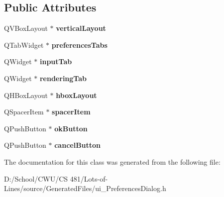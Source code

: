 \subsection*{Public Attributes}
\begin{DoxyCompactItemize}
\item 
Q\+V\+Box\+Layout $\ast$ {\bfseries vertical\+Layout}\hypertarget{class_ui___preferences_dialog_ade30da332012acc7e9342c469ea9ced9}{}\label{class_ui___preferences_dialog_ade30da332012acc7e9342c469ea9ced9}

\item 
Q\+Tab\+Widget $\ast$ {\bfseries preferences\+Tabs}\hypertarget{class_ui___preferences_dialog_a17f3d8be9847cae3c0a5026be2cda41f}{}\label{class_ui___preferences_dialog_a17f3d8be9847cae3c0a5026be2cda41f}

\item 
Q\+Widget $\ast$ {\bfseries input\+Tab}\hypertarget{class_ui___preferences_dialog_a59a7e50717c7178825b430269b5c4657}{}\label{class_ui___preferences_dialog_a59a7e50717c7178825b430269b5c4657}

\item 
Q\+Widget $\ast$ {\bfseries rendering\+Tab}\hypertarget{class_ui___preferences_dialog_a103adee0971c954677c4d8dfb1652345}{}\label{class_ui___preferences_dialog_a103adee0971c954677c4d8dfb1652345}

\item 
Q\+H\+Box\+Layout $\ast$ {\bfseries hbox\+Layout}\hypertarget{class_ui___preferences_dialog_a593e29b0541f5b22ea623a82d47eae52}{}\label{class_ui___preferences_dialog_a593e29b0541f5b22ea623a82d47eae52}

\item 
Q\+Spacer\+Item $\ast$ {\bfseries spacer\+Item}\hypertarget{class_ui___preferences_dialog_a04494ffb0efea38588c361090e354c00}{}\label{class_ui___preferences_dialog_a04494ffb0efea38588c361090e354c00}

\item 
Q\+Push\+Button $\ast$ {\bfseries ok\+Button}\hypertarget{class_ui___preferences_dialog_a4cb797d31b7647bbe35eae1b5b9a4f1d}{}\label{class_ui___preferences_dialog_a4cb797d31b7647bbe35eae1b5b9a4f1d}

\item 
Q\+Push\+Button $\ast$ {\bfseries cancel\+Button}\hypertarget{class_ui___preferences_dialog_aa209554fae0085804c70b702a0f2aa8f}{}\label{class_ui___preferences_dialog_aa209554fae0085804c70b702a0f2aa8f}

\end{DoxyCompactItemize}


The documentation for this class was generated from the following file\+:\begin{DoxyCompactItemize}
\item 
D\+:/\+School/\+C\+W\+U/\+C\+S 481/\+Lots-\/of-\/\+Lines/source/\+Generated\+Files/ui\+\_\+\+Preferences\+Dialog.\+h\end{DoxyCompactItemize}
